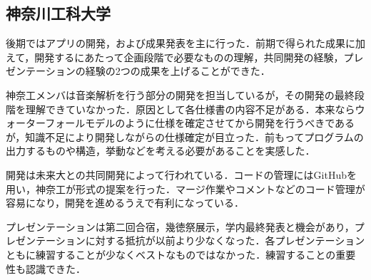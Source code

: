 \subsection{神奈川工科大学}
\par 後期ではアプリの開発，および成果発表を主に行った．前期で得られた成果に加えて，開発するにあたって企画段階で必要なものの理解，共同開発の経験，プレゼンテーションの経験の2つの成果を上げることができた．
\par 神奈工メンバは音楽解析を行う部分の開発を担当しているが，その開発の最終段階を理解できていなかった．原因として各仕様書の内容不足がある．本来ならウォーターフォールモデルのように仕様を確定させてから開発を行うべきであるが，知識不足により開発しながらの仕様確定が目立った．前もってプログラムの出力するものや構造，挙動などを考える必要があることを実感した．
\par 開発は未来大との共同開発によって行われている．コードの管理にはGitHubを用い，神奈工が形式の提案を行った．マージ作業やコメントなどのコード管理が容易になり，開発を進めるうえで有利になっている．
\par プレゼンテーションは第二回合宿，幾徳祭展示，学内最終発表と機会があり，プレゼンテーションに対する抵抗が以前より少なくなった．各プレゼンテーションともに練習することが少なくベストなものではなかった．練習することの重要性も認識できた．
